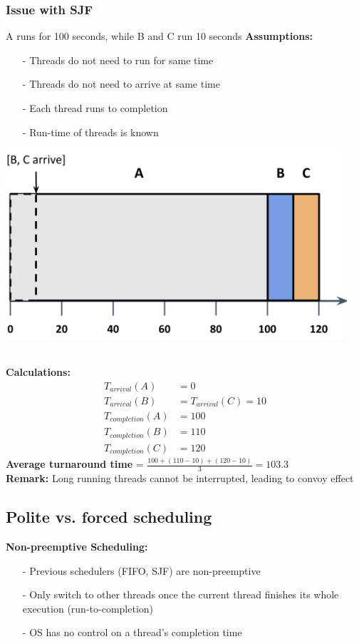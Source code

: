 \documentclass[../../compsys.tex]{subfiles}
\begin{document}
\subsubsection{Issue with SJF}
A runs for 100 seconds, while B and C run 10 seconds
\textbf{Assumptions:}\\[5px]
\begin{minipage}[htp]{0.45\textwidth}
    \begin{itemize}
        \item[-] Threads do not need to run for same time
        \item[-] Threads do not need to arrive at same time
        \item[-] Each thread runs to completion
        \item[-] Run-time of threads is known
    \end{itemize}
\end{minipage}
\hfill
\begin{minipage}[htp]{0.45\textwidth}
    \centering
    \includegraphics[width=0.95\textwidth]{images/sjf_issue.png}
\end{minipage}\\[5px]
\textbf{Calculations:}\\[5px]
\begin{align*}
   T_{arrival}(A) &= 0 \\
   T_{arrival}(B) &= T_{arrival}(C) = 10 \\
   T_{completion}(A) &= 100 \\
   T_{completion}(B) &= 110 \\
   T_{completion}(C) &= 120
\end{align*}
\textbf{Average turnaround time} = $\frac{100 + (110 - 10) + (120 - 10)}{3} = 103.3$\\[5px]
\textbf{Remark: } Long running threads cannot be interrupted, leading to convoy effect
\subsection{Polite vs. forced scheduling}
\textbf{Non-preemptive Scheduling:}\\[5px]
\begin{itemize}
    \item[-] Previous schedulers (FIFO, SJF) are non-preemptive
    \item[-] Only switch to other threads once the current thread finishes its whole execution (run-to-completion)
    \item[-] OS has no control on a thread's completion time
\end{itemize}
\end{document}
